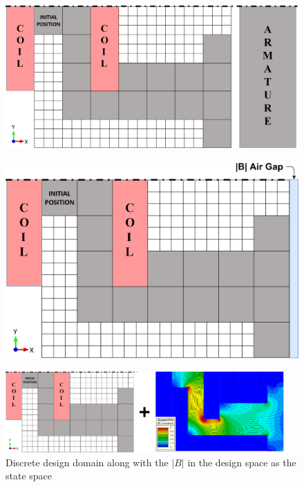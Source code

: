 \begin{figure}[h!]
\centering
\begin{minipage}{.45\textwidth}
  \centering
  \includegraphics[width=0.8\linewidth]{Figures/Ch_MDP/state_repr_1.png}
  \label{fig:MDP_state_repr_original}
\end{minipage}%
\begin{minipage}{.45\textwidth}
  \centering
  \includegraphics[width=0.8\linewidth]{Figures/Ch_MDP/state_repr_2.png}
  \label{fig:MDP_state_repr_2}
\end{minipage}
\end{figure}

\begin{figure}[h!]
    \centering
    \includegraphics[width=0.95\textwidth]{Figures/Ch_MDP/state_repr_3_mdp.png}
    \caption{Discrete design domain  along with the $|B|$ in the design space as the state space}
    \label{fig:MDP_state_repr_3_Bfield}
\end{figure}

